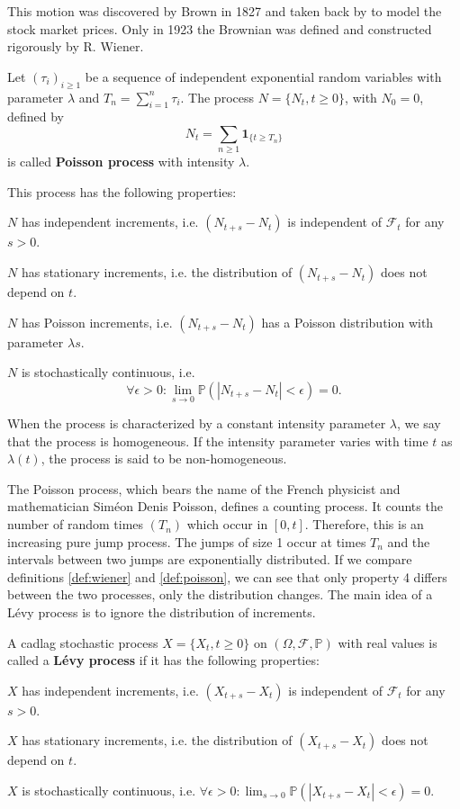 This motion was discovered by Brown in 1827 and taken back by \citeauthor{Bachelier} \citeyearpar{Bachelier} to model the stock market prices. Only in 1923 the Brownian was defined and constructed rigorously by R. Wiener.

\begin{defn}\label{def:poisson}
Let $(\tau_i)_{i\geq 1}$ be a sequence of independent exponential random variables with parameter $\lambda$ and $T_n = \sum_{i=1}^n \tau_i$. The process $N = \{N_t,t\geq 0\}$, with $N_0=0$, defined by
$$N_t = \sum_{n\geq 1}\mathbf{1}_{\{t\geq T_n\}}$$
is called \textbf{Poisson process} with intensity $\lambda$.

This process has the following properties:
\begin{my_list_num}
\item $N$ has independent increments, i.e. $(N_{t+s}-N_t)$ is independent of $\mathcal{F}_t$ for any $s>0$. 
\item $N$ has stationary increments, i.e. the distribution of $(N_{t+s}-N_t)$ does not depend on $t$.
\item $N$ has Poisson increments, i.e. $(N_{t+s}-N_t)$ has a Poisson distribution with parameter $\lambda s$.
\item $N$ is stochastically continuous, i.e. $$\forall \epsilon>0: \lim_{s \to 0}\mathbb{P}(|N_{t+s}-N_t|<\epsilon)=0.$$
\end{my_list_num}
When the process is characterized by a constant intensity parameter $\lambda$, we say that the process is homogeneous. If the intensity parameter varies with time $t$ as $\lambda(t)$, the process is said to be non-homogeneous.
\end{defn}

The Poisson process, which bears the name of the French physicist and mathematician Sim\'eon Denis Poisson, defines a counting process. It counts the number of random times $(T_n)$ which occur in $[0,t]$. Therefore, this is an increasing pure jump process. The jumps of size 1 occur at times $T_n$ and the intervals between two jumps are exponentially distributed. If we compare definitions \ref{def:wiener} and \ref{def:poisson}, we can see that only property 4 differs between the two processes, only the distribution changes. The main idea of a L\'evy process is to ignore the distribution of increments.

\begin{defn}
A cadlag stochastic process $X =\{X_t,t\geq 0\}$ on $(\Omega,\mathcal{F},\mathbb{P})$ with real values is called a \textbf{L\'evy process} if it has the following properties:
\begin{my_list_num}
\item $X$ has independent increments, i.e. $(X_{t+s}-X_t)$ is independent of $\mathcal{F}_t$ for any $s>0$. 
\item $X$ has stationary increments, i.e. the distribution of $(X_{t+s}-X_t)$ does not depend on $t$. 
\item $X$ is stochastically continuous, i.e. $\forall \epsilon>0: \lim_{s \to 0}\mathbb{P}(|X_{t+s}-X_t|<\epsilon)=0.$
\end{my_list_num}
\end{defn}

